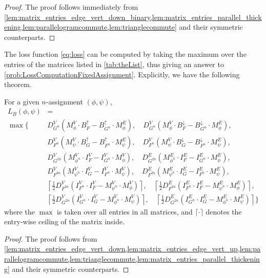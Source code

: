 \begin{proof}
The proof follows immediately from 
\cref{lem:matrix_entries_edge_vert_down_binary,lem:matrix_entries_parallel_thickening,lem:parallelogramcommute,lem:trianglecommute} and their symmetric counterparts.
\end{proof}



The loss function \cref{eq:loss} can be computed by taking the maximum over the entries of the matrices listed in \cref{tab:theList}, thus giving an answer to \cref{prob:LossComputationFixedAssignment}. 
Explicitly, we have the following theorem.


\begin{theorem}
\label{thm:LossEquivMatrices}
For a given $n$-assignment $(\phi, \psi)$,
\begin{align*}
    L_B(\phi,\psi) &= \\
    \max \Big\{  
    & D_{G^n}^V \left(M_{\phi}^V \cdot B_F^{\uparrow} - B_{G^n}^{\uparrow} \cdot M_{\phi}^E\right), \quad D_{G^n}^V \left(M_{\phi}^V \cdot B_F^{\downarrow} - B_{G^n}^{\downarrow} \cdot M_{\phi}^E\right),\\
    &D_{F^n}^V \left(M_{\psi}^V \cdot B_G^{\uparrow} - B_{F^n}^{\uparrow} \cdot M_{\psi}^E\right), \quad D_{F^n}^V \left(M_{\psi}^V \cdot B_G^{\downarrow} - B_{F^n}^{\downarrow} \cdot M_{\psi}^E\right),\\
    & D_{G^{2n}}^V \left(M_{\phi^n}^V \cdot I_F^V - I_{G^n}^V \cdot M_{\phi}^V\right), \quad D_{G^{2n}}^E \left(M_{\phi^n}^E \cdot I_F^E - I_{G^n}^E \cdot M_{\phi}^E\right),\\
    & D_{F^{2n}}^V \left(M_{\psi^n}^V \cdot I_G^V - I_{F^n}^V \cdot M_{\psi}^V\right), \quad D_{F^{2n}}^E \left(M_{\psi^n}^E \cdot I_G^E - I_{F^n}^E \cdot M_{\psi}^E\right),\\
    & 
     \left\lceil \tfrac{1}{2} D_{F^{2n}}^V \left(I_{F^n}^V \cdot I_F^V - M_{\psi^n}^V\cdot M_{\phi}^V \right) \right\rceil, 
    \quad 
     \left\lceil \tfrac{1}{2} D_{F^{2n}}^E \left(I_{F^n}^E \cdot I_F^E - M_{\psi^n}^E\cdot M_{\phi}^E \right)\right\rceil,\\
    & 
     \left\lceil \tfrac{1}{2} D_{G^{2n}}^V \left(I_{G^n}^V \cdot I_G^V - M_{\phi^n}^V\cdot M_{\psi}^V \right)\right\rceil, 
    \quad 
     \left\lceil \tfrac{1}{2} D_{G^{2n}}^E \left(I_{G^n}^E \cdot I_G^E - M_{\phi^n}^E\cdot M_{\psi}^E \right)\right\rceil
    \Big\}
\end{align*}
where the $\max$ is taken over all entries in all matrices, and $\lceil \cdot \rceil$ denotes the entry-wise ceiling of the matrix inside.
\end{theorem}

\begin{proof}
    The proof follows from \cref{lem:matrix_entries_edge_vert_down,lem:matrix_entries_edge_vert_up,lem:parallelogramcommute,lem:trianglecommute,lem:matrix_entries_parallel_thickening} and their symmetric counterparts.
\end{proof}


%
%
